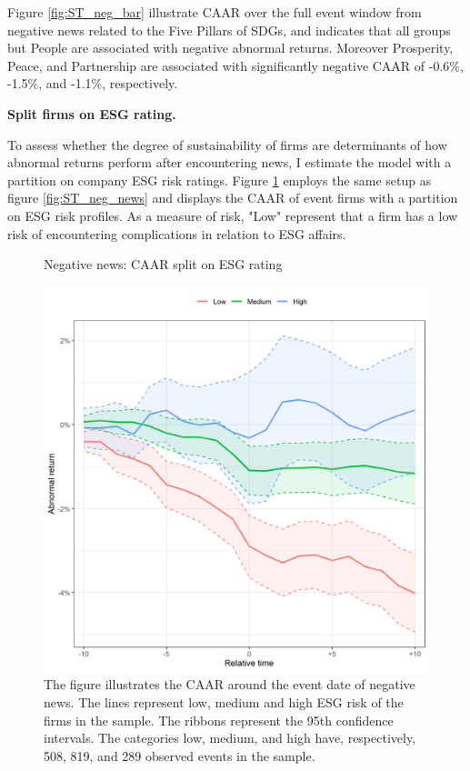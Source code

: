 Figure \ref{fig:ST_neg_bar} illustrate CAAR over the full event window from negative news related to the Five Pillars of SDGs, and indicates that all groups but People are associated with negative abnormal returns. Moreover Prosperity, Peace, and Partnership are associated with significantly negative CAAR of -0.6\%, -1.5\%, and -1.1\%, respectively.       

\noindent \textbf{Split firms on ESG rating.} 

To assess whether the degree of sustainability of firms are determinants of how abnormal returns perform after encountering news, I estimate the model with a partition on company ESG risk ratings. Figure \ref{fig:ST_neg_ESG} employs the same setup as figure \ref{fig:ST_neg_news} and displays the CAAR of event firms with a partition on ESG risk profiles. As a measure of risk, "Low" represent that a firm has a low risk of encountering complications in relation to ESG affairs.

\begin{figure} [H]
    \centering
    \caption{Negative news: CAAR split on ESG rating}
    \includegraphics[scale=0.6]{Projekt/1.Figures analysis/ST_negative_ESG.png}
     \caption*{\footnotesize The figure illustrates the CAAR around the event date of negative news. The lines represent low, medium and high ESG risk of the firms in the sample. The ribbons represent the 95th confidence intervals. The categories low, medium, and high have, respectively, 508, 819, and 289 observed events in the sample. }
    \label{fig:ST_neg_ESG}
\end{figure} 


